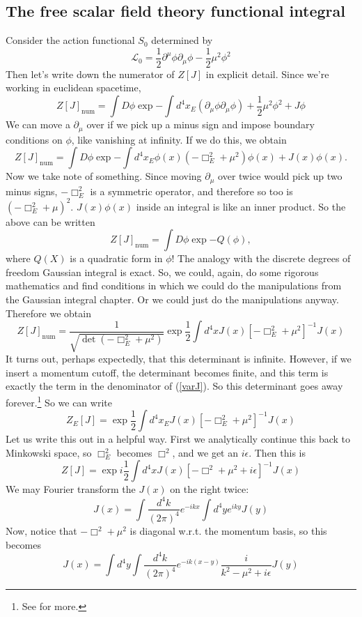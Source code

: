 \documentclass{book}
\begin{document}
\subsection{The free scalar field theory functional integral}
Consider the action functional $S_0$ determined by 
\[
\mathcal{L}_0 = \frac{1}{2} \partial^\mu \phi \partial_\mu \phi - \frac{1}{2} \mu^2 \phi^2
\]
Then let's write down the numerator of $Z[J]$ in explicit detail. Since we're working in euclidean spacetime,
\[
Z[J]_{\text{num}} = \int D \phi \exp{- \int d^4 x_E ( \partial_\mu \phi \partial_\mu \phi) + \frac{1}{2} \mu^2 \phi^2} + J\phi
\]
We can move a $\partial_\mu$ over if we pick up a minus sign and impose boundary conditions on $\phi$, like vanishing at infinity. If we do this, we obtain
\[
Z[J]_{\text{num}} =  \int D \phi \exp{ - \int d^4 x_E \phi(x) \left( 
-\Box^2_E + \mu^2
\right) \phi(x) + J(x) \phi(x)}.
\] 
Now we take note of something. Since moving $\partial_\mu$ over twice would pick up two minus signs, $-\Box_E^2$ is a symmetric operator, and therefore so too is $(-\Box_E^2 + \mu)^2$. $J(x) \phi(x)$ inside an integral is like an inner product. So the above can be written
\[
Z[J]_{\text{num}} = \int D \phi \exp{- Q(\phi)},
\]
where $Q(X)$ is a quadratic form in $\phi$! The analogy with the discrete degrees of freedom Gaussian integral is exact. So, we could, again, do some rigorous mathematics and find conditions in which we could do the manipulations from the Gaussian integral chapter. Or we could just do the manipulations anyway. Therefore we obtain
\[
Z[J]_{\text{num}} = \frac{1}{\sqrt{\det (-\Box_E^2 + \mu^2)}} \exp{\frac{1}{2}\int d^4 x J(x) [- \Box_E^2 + \mu^2]^{-1}  J(x)}
\]
It turns out, perhaps expectedly, that this determinant is infinite. However, if we insert a momentum cutoff, the determinant becomes finite, and this term is exactly the term in the denominator of (\ref{varJ}). So this determinant goes away forever.\footnote{See \cite{Co1} for more.} So we can write
\[
Z_E[J] = \exp{\frac{1}{2}\int d^4 x_E J(x) [-\Box_E^2 + \mu^2]^{-1} J(x)}
\]
Let us write this out in a helpful way. First we analytically continue this back to Minkowski space, so $\Box_E^2$ becomes $\Box^2$, and we get an $i \epsilon$. Then this is
\[
Z[J] = \exp{i \frac{1}{2} \int d^4 x J(x) [-\Box^2 + \mu^2 + i\epsilon]^{-1} J(x)}
\]
We may Fourier transform the $J(x)$ on the right twice:
\[
J(x) = \int \frac{d^4 k}{(2\pi)^4} e^{-ikx} \int d^4 y e^{iky} J(y)
\]
Now, notice that $-\Box^2 + \mu^2$ is diagonal w.r.t. the momentum basis, so this becomes
\[
J(x) = \int d^4 y \int \frac{d^4 k}{(2\pi)^4} e^{-ik(x-y)} \frac{i}{k^2 - \mu^2 + i \epsilon}
J(y)
\]
\end{document}
